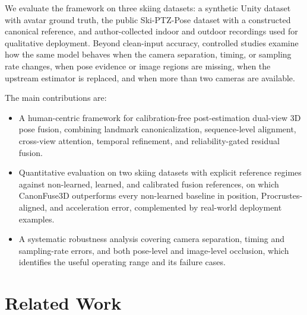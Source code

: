 \documentclass[preprint,12pt]{elsarticle}
\providecommand{\DIFaddbegin}{} %
\providecommand{\DIFaddend}{} %
\providecommand{\DIFadd}[1]{{\protect\color{blue}#1}} %
\begin{document}
\DIFadd{We evaluate the framework on }\DIFaddend three skiing datasets:  \DIFaddbegin \DIFadd{a synthetic Unity dataset with avatar ground truth, the }\DIFaddend public Ski-PTZ-Pose  \DIFaddbegin \DIFadd{dataset with a constructed canonical reference}\DIFaddend , and author-collected indoor and outdoor recordings \DIFaddbegin \DIFadd{used }\DIFaddend for qualitative deployment.  \DIFaddbegin \DIFadd{Beyond clean-input accuracy, controlled }\DIFaddend studies examine how the same  \DIFaddbegin \DIFadd{model behaves when the camera separation, timing, or sampling rate changes, when pose evidence or image regions are missing, when the upstream estimator is replaced, and when more than two cameras are available}\DIFaddend .

The main contributions are:
\begin{itemize}
    \item A human-centric framework for calibration-free post-estimation dual-view 3D pose  \DIFaddbegin \DIFadd{fusion, combining landmark canonicalization, sequence-level alignment, cross-view attention, temporal refinement, and reliability-gated residual fusion}\DIFaddend .
    \item Quantitative evaluation on two skiing datasets with explicit reference regimes  \DIFaddbegin \DIFadd{against non-learned, learned, and calibrated fusion references, on which CanonFuse3D outperforms every non-learned baseline in position, Procrustes-aligned, and acceleration error, complemented by }\DIFaddend real-world deployment  \DIFaddbegin \DIFadd{examples}\DIFaddend .
    \item  \DIFaddbegin \DIFadd{A systematic robustness analysis covering camera separation, timing and sampling-rate errors, and both pose-level and image-level occlusion, which identifies the useful operating range and its }\DIFaddend failure cases.
\end{itemize}

\section{Related Work}
\label{sec:related_work}
\end{document}
